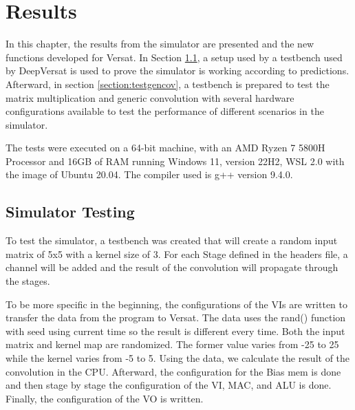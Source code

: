 
\chapter{Results}
\label{chapter:results}

In this chapter, the results from the simulator are presented and the new functions developed
for Versat. In Section \ref{section:simtest}, a setup used by a testbench used by DeepVersat is used
to prove the simulator is working according to predictions. Afterward, in section \ref{section:testgencov}, 
a testbench is prepared to test the matrix multiplication and generic convolution with several hardware configurations
available to test the performance of different scenarios in the simulator.

The tests were executed on a 64-bit machine, with an AMD Ryzen 7 5800H Processor and 16GB of RAM running
Windows 11, version 22H2, WSL 2.0 with the image of Ubuntu 20.04. The compiler used is g++ version 9.4.0.

\section{Simulator Testing}
\label{section:simtest}

To test the simulator, a testbench was created that will create a random input matrix of 5x5
with a kernel size of 3. For each Stage defined in the headers file, a channel will be added and
the result of the convolution will propagate through the stages.

To be more specific in the beginning, the configurations of the VIs are written to transfer the data
from the program to Versat. The data uses the rand() function with seed using current time
so the result is different every time. Both the input matrix and kernel map are randomized.
The former value varies from -25 to 25 while the kernel varies from -5 to 5. Using the data, 
we calculate the result of the convolution in the CPU. Afterward, the configuration for the Bias mem
is done and then stage by stage the configuration of the VI, MAC, and ALU is done. Finally, the
configuration of the VO is written.

